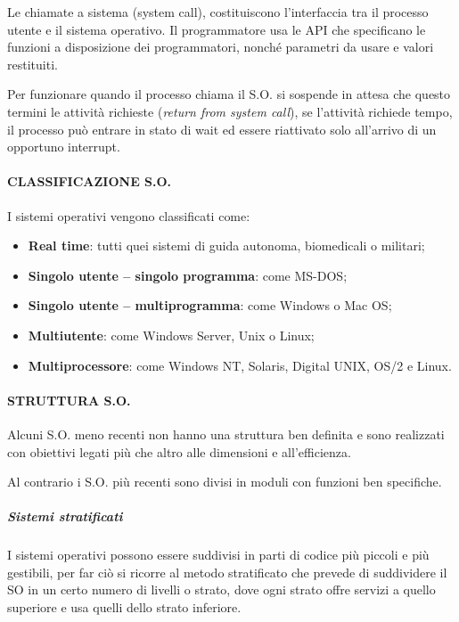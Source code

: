 Le chiamate a sistema (system call), costituiscono l'interfaccia tra il
processo utente e il sistema operativo. Il programmatore usa le API che
specificano le funzioni a disposizione dei programmatori, nonché
parametri da usare e valori restituiti.

Per funzionare quando il processo chiama il S.O. si sospende in attesa
che questo termini le attività richieste (\emph{return from system
call}), se l'attività richiede tempo, il processo può entrare in stato
di wait ed essere riattivato solo all'arrivo di un opportuno interrupt.

\paragraph{CLASSIFICAZIONE S.O.}\label{classificazione-s.o.}

I sistemi operativi vengono classificati come:

\begin{itemize}
\item
  \textbf{Real time}: tutti quei sistemi di guida autonoma, biomedicali
  o militari;
\item
  \textbf{Singolo utente -- singolo programma}: come MS-DOS;
\item
  \textbf{Singolo utente -- multiprogramma}: come Windows o Mac OS;
\item
  \textbf{Multiutente}: come Windows Server, Unix o Linux;
\item
  \textbf{Multiprocessore}: come Windows NT, Solaris, Digital UNIX, OS/2
  e Linux.
\end{itemize}

\paragraph{STRUTTURA S.O.}\label{struttura-s.o.}

Alcuni S.O. meno recenti non hanno una struttura ben definita e sono
realizzati con obiettivi legati più che altro alle dimensioni e
all'efficienza.

Al contrario i S.O. più recenti sono divisi in moduli con funzioni ben
specifiche.

\subparagraph{\texorpdfstring{\emph{Sistemi
stratificati}}{Sistemi stratificati}}\label{sistemi-stratificati}

I sistemi operativi possono essere suddivisi in parti di codice più
piccoli e più gestibili, per far ciò si ricorre al metodo stratificato
che prevede di suddividere il SO in un certo numero di livelli o strato,
dove ogni strato offre servizi a quello superiore e usa quelli dello
strato inferiore.

